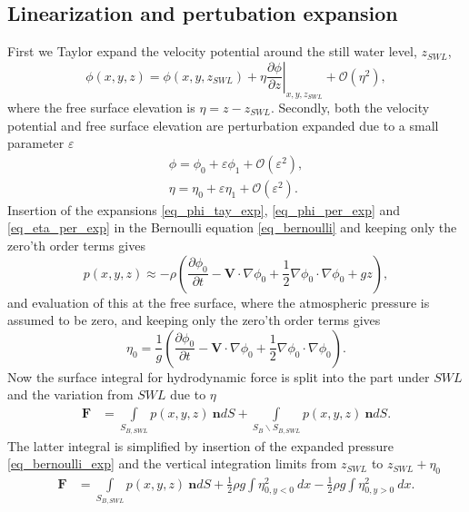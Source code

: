 \documentclass[A4paper,11pt]{marine_2023_Paper}
\newcommand{\V}[1]{\boldsymbol{#1}}
\newcommand{\D}[2]{\frac{\partial #1}{\partial #2}}
\begin{document}
\subsection{Linearization and pertubation expansion}
First we Taylor expand the velocity potential around the still water level, $z_{SWL}$,
\begin{equation}
	\phi(x,y,z) = \phi(x,y,z_{SWL}) + \eta \left.\D{\phi}{z}\right|_{x,y,z_{SWL}} + \mathcal{O}(\eta^2),
	\label{eq_phi_tay_exp}
\end{equation}
where the free surface elevation is $\eta = z-z_{SWL}$. Secondly, both the velocity potential and free surface elevation are perturbation expanded due to a small parameter $\varepsilon$
\begin{align}
	\phi = \phi_0 + \varepsilon \phi_1 + \mathcal{O}(\varepsilon^2), \label{eq_phi_per_exp} \\
	\eta = \eta_0 + \varepsilon \eta_1 + \mathcal{O}(\varepsilon^2).\label{eq_eta_per_exp}
\end{align}
Insertion of the expansions \eqref{eq_phi_tay_exp}, \eqref{eq_phi_per_exp} and \eqref{eq_eta_per_exp} in the Bernoulli equation \eqref{eq_bernoulli} and keeping only the zero'th order terms gives
\begin{equation}
	p(x, y, z) \approx -\rho \left(\D{\phi_0}{t} -\V{V} \cdot \nabla \phi_0 + \frac{1}{2} \nabla \phi_0 \cdot \nabla \phi_0 + gz \right),
	\label{eq_bernoulli_exp}
\end{equation}
and evaluation of this at the free surface, where the atmospheric pressure is assumed to be zero, and keeping only the zero'th order terms gives
\begin{equation}
	\eta_0 =  \frac{1}{g} \left(\D{\phi_0}{t} -\V{V} \cdot \nabla \phi_0 + \frac{1}{2} \nabla \phi_0 \cdot \nabla \phi_0\right).
\end{equation}
Now the surface integral for hydrodynamic force is split into the part under $SWL$ and the variation from $SWL$ due to $\eta$
\begin{align}
	\V{F} &= \int\limits_{S_{B,SWL}} p(x, y, z) ~\V{n} dS + \int\limits_{ S_B\backslash S_{B,SWL}} p(x, y, z) ~\V{n} dS.
\end{align}
The latter integral is simplified by insertion of the expanded pressure \eqref{eq_bernoulli_exp} and the vertical integration limits from $z_{SWL}$ to $z_{SWL}+\eta_0$
\begin{align}
	\V{F} &= \int\limits_{S_{B,SWL}} p(x, y, z) ~\V{n} dS + \frac{1}{2}\rho g\int  \eta_{0,y<0}^2 ~dx- \frac{1}{2}\rho g\int\eta_{0,y>0}^2 ~ dx.
\end{align}
\end{document}

